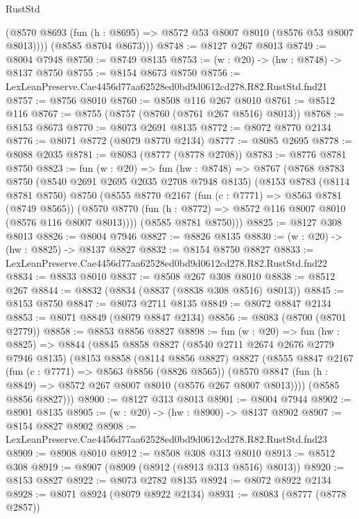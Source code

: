 \begin{lexlean}{RustStd}
\begin{coremodule}
          (@8570 @8693 (fun (h : @8695) => @8572 @53 @8007 @8010 (@8576 @53 @8007 @8013))))
        (@8585 @8704 @8673)))
@8748 := @8127 @267 @8013
@8749 := @8004 @7948
@8750 := @8749 @8135
@8753 := (w : @20) -> (hw : @8748) -> @8137 @8750
@8755 := @8154 @8673 @8750
@8756 := LexLeanPreserve.Cae4456d77aa62528ed0bd9d0612cd278.R82.RustStd.fnd21
@8757 := @8756 @8010
@8760 := @8508 @116 @267 @8010
@8761 := @8512 @116
@8767 := @8755 (@8757 (@8760 (@8761 @267 @8516) @8013))
@8768 := @8153 @8673
@8770 := @8073 @2691 @8135
@8772 := @8072 @8770 @2134
@8776 := @8071 @8772 (@8079 @8770 @2134)
@8777 := @8085 @2695
@8778 := @8088 @2035
@8781 := @8083 (@8777 (@8778 @2708))
@8783 := @8776 @8781 @8750
@8823 := fun (w : @20) =>
  fun (hw : @8748) =>
  @8767
    (@8768
      @8783
      @8750
      (@8540 @2691 @2695 @2035 @2708 @7948 @8135)
      (@8153
        @8783
        (@8114 @8781 @8750)
        @8750
        (@8555
          @8770
          @2167
          (fun (c : @7771) => @8563 @8781 (@8749 @8565))
          (@8570 @8770 (fun (h : @8772) => @8572 @116 @8007 @8010 (@8576 @116 @8007 @8013))))
        (@8585 @8781 @8750)))
@8825 := @8127 @308 @8013
@8826 := @8004 @7946
@8827 := @8826 @8135
@8830 := (w : @20) -> (hw : @8825) -> @8137 @8827
@8832 := @8154 @8750 @8827
@8833 := LexLeanPreserve.Cae4456d77aa62528ed0bd9d0612cd278.R82.RustStd.fnd22
@8834 := @8833 @8010
@8837 := @8508 @267 @308 @8010
@8838 := @8512 @267
@8844 := @8832 (@8834 (@8837 (@8838 @308 @8516) @8013))
@8845 := @8153 @8750
@8847 := @8073 @2711 @8135
@8849 := @8072 @8847 @2134
@8853 := @8071 @8849 (@8079 @8847 @2134)
@8856 := @8083 (@8700 (@8701 @2779))
@8858 := @8853 @8856 @8827
@8898 := fun (w : @20) =>
  fun (hw : @8825) =>
  @8844
    (@8845
      @8858
      @8827
      (@8540 @2711 @2674 @2676 @2779 @7946 @8135)
      (@8153
        @8858
        (@8114 @8856 @8827)
        @8827
        (@8555
          @8847
          @2167
          (fun (c : @7771) => @8563 @8856 (@8826 @8565))
          (@8570 @8847 (fun (h : @8849) => @8572 @267 @8007 @8010 (@8576 @267 @8007 @8013))))
        (@8585 @8856 @8827)))
@8900 := @8127 @313 @8013
@8901 := @8004 @7944
@8902 := @8901 @8135
@8905 := (w : @20) -> (hw : @8900) -> @8137 @8902
@8907 := @8154 @8827 @8902
@8908 := LexLeanPreserve.Cae4456d77aa62528ed0bd9d0612cd278.R82.RustStd.fnd23
@8909 := @8908 @8010
@8912 := @8508 @308 @313 @8010
@8913 := @8512 @308
@8919 := @8907 (@8909 (@8912 (@8913 @313 @8516) @8013))
@8920 := @8153 @8827
@8922 := @8073 @2782 @8135
@8924 := @8072 @8922 @2134
@8928 := @8071 @8924 (@8079 @8922 @2134)
@8931 := @8083 (@8777 (@8778 @2857))

\end{coremodule}
\end{lexlean}
